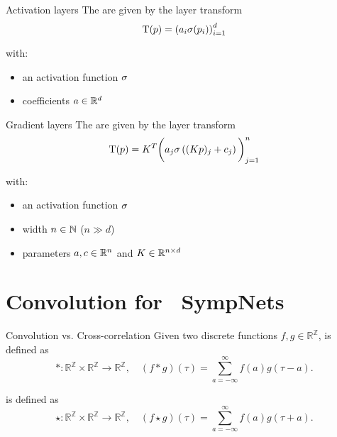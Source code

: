 \begin{frame}[c]{Activation layers}
  The  are given by the layer transform
  \begin{equation*}
    \mathrm{T}(p) = \left( a_i \sigma(p_i) \right)_{i=1}^d
  \end{equation*}

  with:
  \begin{itemize}
    \item an activation function $\sigma$
    \item coefficients $a \in \mathbb{R}^d$ 
  \end{itemize}
\end{frame}

\begin{frame}[c]{Gradient layers}
  The  are given by the layer transform
  \begin{equation*}
    \mathrm{T}(p) = K^T \bigg( a_j \sigma \left( (Kp)_j + c_j \right) \bigg)_{j=1}^n
  \end{equation*}

  with:
  \begin{itemize}
    \item an activation function $\sigma$
    \item width $n \in \mathbb{N}$ ($n \gg d$)
    \item parameters $a,c \in \mathbb{R}^n$ and $K \in \mathbb{R}^{n \times d}$
  \end{itemize}
\end{frame}

\section{Convolution for ~\newline SympNets}

\begin{frame}[c]{Convolution vs. Cross-correlation}
  Given two discrete functions $f,g \in \mathbb{R}^\mathbb{Z}$, 
   is defined as 
  \begin{equation*}
    *: \mathbb{R}^{\mathbb{Z}} \times \mathbb{R}^{\mathbb{Z}} \to \mathbb{R}^{\mathbb{Z}},
    \quad (f*g)(\tau) = \sum^{\infty}_{a=-\infty} f(a) g(\tau - a)
    .
  \end{equation*}

   is defined as
  \begin{equation*}
    \star: \mathbb{R}^{\mathbb{Z}} \times \mathbb{R}^{\mathbb{Z}} \to \mathbb{R}^{\mathbb{Z}},
    \quad (f \star g)(\tau) = \sum^{\infty}_{a=-\infty} f(a) g(\tau + a)
    .
  \end{equation*}
\end{frame}

